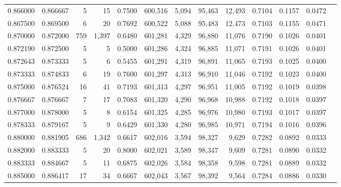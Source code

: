 \begin{tabular}{rrrrrrrrrrrrr}
0.866000 & 0.866667 &      5 &    15 &                                     0.7500 & 600,516 &   5,094 &  95,463 &  12,493 & 0.7104 & 0.1157 & 0.0472 \\
0.867500 & 0.869500 &      6 &    20 &                                     0.7692 & 600,522 &   5,088 &  95,483 &  12,473 & 0.7103 & 0.1155 & 0.0471 \\
0.870000 & 0.872000 &    759 & 1,397 &                                     0.6480 & 601,281 &   4,329 &  96,880 &  11,076 & 0.7190 & 0.1026 & 0.0401 \\
0.872190 & 0.872500 &      5 &     5 &                                     0.5000 & 601,286 &   4,324 &  96,885 &  11,071 & 0.7191 & 0.1026 & 0.0401 \\
0.872643 & 0.873333 &      5 &     6 &                                     0.5455 & 601,291 &   4,319 &  96,891 &  11,065 & 0.7193 & 0.1025 & 0.0400 \\
0.873333 & 0.874833 &      6 &    19 &                                     0.7600 & 601,297 &   4,313 &  96,910 &  11,046 & 0.7192 & 0.1023 & 0.0400 \\
0.875000 & 0.876524 &     16 &    41 &                                     0.7193 & 601,313 &   4,297 &  96,951 &  11,005 & 0.7192 & 0.1019 & 0.0398 \\
0.876667 & 0.876667 &      7 &    17 &                                     0.7083 & 601,320 &   4,290 &  96,968 &  10,988 & 0.7192 & 0.1018 & 0.0397 \\
0.877000 & 0.878000 &      5 &     8 &                                     0.6154 & 601,325 &   4,285 &  96,976 &  10,980 & 0.7193 & 0.1017 & 0.0397 \\
0.878333 & 0.879167 &      5 &     9 &                                     0.6429 & 601,330 &   4,280 &  96,985 &  10,971 & 0.7194 & 0.1016 & 0.0396 \\
0.880000 & 0.881905 &    686 & 1,342 &                                     0.6617 & 602,016 &   3,594 &  98,327 &   9,629 & 0.7282 & 0.0892 & 0.0333 \\
0.882000 & 0.883333 &      5 &    20 &                                     0.8000 & 602,021 &   3,589 &  98,347 &   9,609 & 0.7281 & 0.0890 & 0.0332 \\
0.883333 & 0.884667 &      5 &    11 &                                     0.6875 & 602,026 &   3,584 &  98,358 &   9,598 & 0.7281 & 0.0889 & 0.0332 \\
0.885000 & 0.886417 &     17 &    34 &                                     0.6667 & 602,043 &   3,567 &  98,392 &   9,564 & 0.7284 & 0.0886 & 0.0330 \\

\end{tabular}
